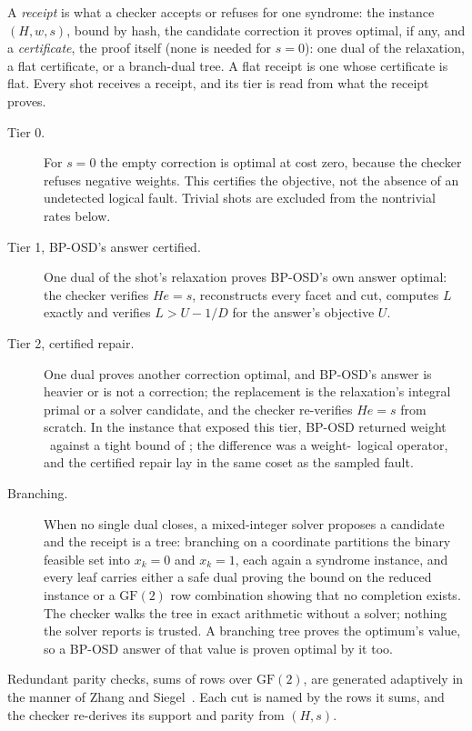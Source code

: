 \documentclass[aps,pra,twocolumn,superscriptaddress,nofootinbib,longbibliography,floatfix]{revtex4-2}
\newcommand{\GF}{\mathrm{GF}(2)}
\begin{document}
A \emph{receipt} is what a checker accepts or refuses for one syndrome: the instance $(H,w,s)$, bound by hash, the candidate correction it proves optimal, if any, and a \emph{certificate}, the proof itself (none is needed for $s=0$): one dual of the relaxation, a flat certificate, or a branch-dual tree. A flat receipt is one whose certificate is flat. Every shot receives a receipt, and its tier is read from what the receipt proves.
\begin{description}
\item[Tier 0.] For $s=0$ the empty correction is optimal at cost zero, because the checker refuses negative weights. This certifies the objective, not the absence of an undetected logical fault. Trivial shots are excluded from the nontrivial rates below.
\item[Tier 1, BP-OSD's answer certified.] One dual of the shot's relaxation proves BP-OSD's own answer optimal: the checker verifies $He=s$, reconstructs every facet and cut, computes $L$ exactly and verifies $L>U-1/D$ for the answer's objective $U$.
\item[Tier 2, certified repair.] One dual proves another correction optimal, and BP-OSD's answer is heavier or is not a correction; the replacement is the relaxation's integral primal or a solver candidate, and the checker re-verifies $He=s$ from scratch. In the instance that exposed this tier, BP-OSD returned weight \DiscBpWeight\ against a tight bound of \DiscBound; the difference was a weight-\DiscFaultWeight\ logical operator, and the certified repair lay in the same coset as the sampled fault.
\item[Branching.] When no single dual closes, a mixed-integer solver proposes a candidate and the receipt is a tree: branching on a coordinate partitions the binary feasible set into $x_k=0$ and $x_k=1$, each again a syndrome instance, and every leaf carries either a safe dual proving the bound on the reduced instance or a $\GF$ row combination showing that no completion exists. The checker walks the tree in exact arithmetic without a solver; nothing the solver reports is trusted. A branching tree proves the optimum's value, so a BP-OSD answer of that value is proven optimal by it too.
\end{description}
Redundant parity checks, sums of rows over $\GF$, are generated adaptively in the manner of Zhang and Siegel~\cite{zhangsiegel2012adaptive}. Each cut is named by the rows it sums, and the checker re-derives its support and parity from $(H,s)$.
\end{document}
